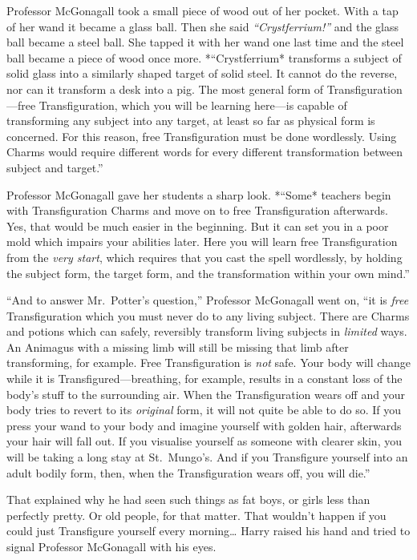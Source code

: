 Professor McGonagall took a small piece of wood out of her pocket. With
a tap of her wand it became a glass ball. Then she said
\emph{``Crystferrium!''} and the glass ball became a steel ball. She
tapped it with her wand one last time and the steel ball became a piece
of wood once more. *``Crystferrium* transforms a subject of solid glass
into a similarly shaped target of solid steel. It cannot do the reverse,
nor can it transform a desk into a pig. The most general form of
Transfiguration---free Transfiguration, which you will be learning
here---is capable of transforming any subject into any target, at least
so far as physical form is concerned. For this reason, free
Transfiguration must be done wordlessly. Using Charms would require
different words for every different transformation between subject and
target.''

Professor McGonagall gave her students a sharp look. *``Some* teachers
begin with Transfiguration Charms and move on to free Transfiguration
afterwards. Yes, that would be much easier in the beginning. But it can
set you in a poor mold which impairs your abilities later. Here you will
learn free Transfiguration from the \emph{very start}, which requires
that you cast the spell wordlessly, by holding the subject form, the
target form, and the transformation within your own mind.''

``And to answer Mr.~Potter's question,'' Professor McGonagall went on,
``it is \emph{free} Transfiguration which you must never do to any
living subject. There are Charms and potions which can safely,
reversibly transform living subjects in \emph{limited} ways. An Animagus
with a missing limb will still be missing that limb after transforming,
for example. Free Transfiguration is \emph{not} safe. Your body will
change while it is Transfigured---breathing, for example, results in a
constant loss of the body's stuff to the surrounding air. When the
Transfiguration wears off and your body tries to revert to its
\emph{original} form, it will not quite be able to do so. If you press
your wand to your body and imagine yourself with golden hair, afterwards
your hair will fall out. If you visualise yourself as someone with
clearer skin, you will be taking a long stay at St.~Mungo's. And if you
Transfigure yourself into an adult bodily form, then, when the
Transfiguration wears off, you will die.''

That explained why he had seen such things as fat boys, or girls less
than perfectly pretty. Or old people, for that matter. That wouldn't
happen if you could just Transfigure yourself every morning\ldots{}
Harry raised his hand and tried to signal Professor McGonagall with his
eyes.


